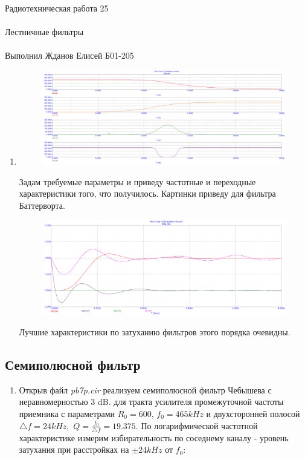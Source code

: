 \documentclass{astroedu-lab}
\begin{document}
\begin{problem}{\huge Радиотехническая работа 25\\\\Лестничные фильтры\\\\Выполнил Жданов Елисей Б01-205}
\begin{enumerate}

\item 

\begin{figure}[!h]
	\centering
	\includegraphics[width=1\textwidth]{4.2.png}
	\label{fig:boiler}
\end{figure}

Задам требуемые параметры и приведу частотные и переходные характеристики того, что получилось. Картинки приведу для фильтра Баттерворта.

\begin{figure}[!h]
	\centering
	\includegraphics[width=1\textwidth]{4.3.png}
	\label{fig:boiler}
\end{figure}

Лучшие характеристики по затуханию фильтров этого порядка очевидны.

\end{enumerate}

\subsection{Семиполюсной фильтр}

\begin{enumerate}

\item Открыв файл \textit{pb7p.cir} реализуем семиполюсной фильтр Чебышева с неравномерностью 3 dB. для тракта усилителя промежуточной частоты приемника с параметрами $R_0 = 600$, $f_0 = 465 kHz$ и двухсторонней полосой $\bigtriangleup f = 24 kHz,$ $Q = \frac{f_0}{\bigtriangleup f} = 19.375$. По логарифмической частотной характеристике измерим избирательность по соседнему каналу - уровень затухания при расстройках на $\pm 24 kHz$ от $f_0$:


\end{enumerate}
\end{problem}
\end{document}
